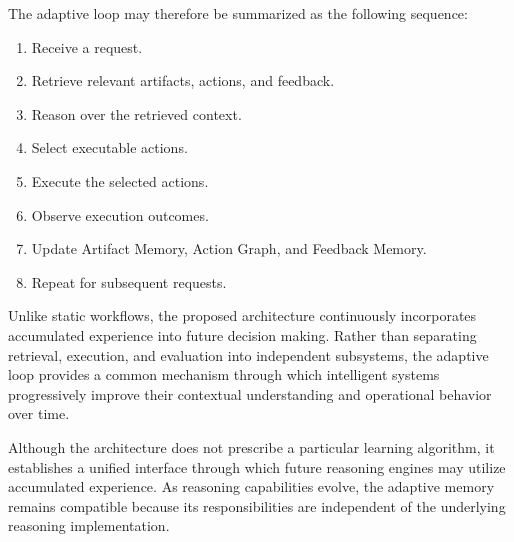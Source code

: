 The adaptive loop may therefore be summarized as the following sequence:

\begin{enumerate}
\item Receive a request.
\item Retrieve relevant artifacts, actions, and feedback.
\item Reason over the retrieved context.
\item Select executable actions.
\item Execute the selected actions.
\item Observe execution outcomes.
\item Update Artifact Memory, Action Graph, and Feedback Memory.
\item Repeat for subsequent requests.
\end{enumerate}

Unlike static workflows, the proposed architecture continuously incorporates accumulated experience into future decision making. Rather than separating retrieval, execution, and evaluation into independent subsystems, the adaptive loop provides a common mechanism through which intelligent systems progressively improve their contextual understanding and operational behavior over time.

Although the architecture does not prescribe a particular learning algorithm, it establishes a unified interface through which future reasoning engines may utilize accumulated experience. As reasoning capabilities evolve, the adaptive memory remains compatible because its responsibilities are independent of the underlying reasoning implementation.


